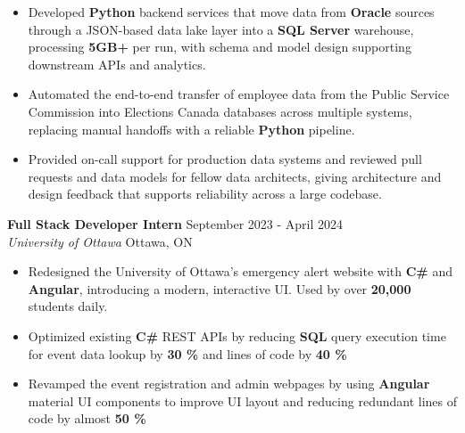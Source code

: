\documentclass[a4paper]{article}
\begin{document}
\begin{itemize}
\item Developed \textbf{Python} backend services that move data from \textbf{Oracle} sources through a JSON-based data lake layer into a \textbf{SQL Server} warehouse, processing \textbf{5GB+} per run, with schema and model design supporting downstream APIs and analytics.

\item Automated the end-to-end transfer of employee data from the Public Service Commission into Elections Canada databases across multiple systems, replacing manual handoffs with a reliable \textbf{Python} pipeline.

\item Provided on-call support for production data systems and reviewed pull requests and data models for fellow data architects, giving architecture and design feedback that supports reliability across a large codebase.

\end{itemize}

\textbf{Full Stack Developer Intern } \hfill September 2023 - April 2024\\
\textit{University of Ottawa} \hfill Ottawa, ON\\
\vspace{-2mm}
\begin{itemize} \itemsep -4pt
    \item Redesigned the University of Ottawa's emergency alert website with \textbf{C\#} and \textbf{Angular}, introducing a modern, interactive UI. Used by over \textbf{20,000} students daily.
     \item Optimized existing \textbf{C\#} REST APIs by reducing \textbf{SQL} query execution time for event data lookup by \textbf{30 \%} and lines of code by \textbf{40 \%}
    \item Revamped the event registration and admin webpages by using \textbf{Angular} material UI components to improve UI layout and reducing redundant lines of code by almost \textbf{50 \%}
\end{itemize}
\end{document}
